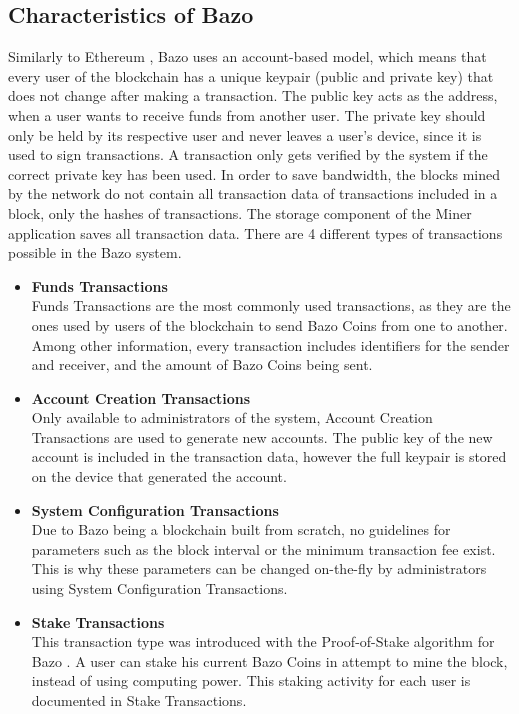 \subsection{Characteristics of Bazo}
Similarly to Ethereum \cite{ethereum}, Bazo uses an account-based model, which means that every user of the blockchain has a unique keypair (public and private key) that does not change after making a transaction. The public key acts as the address, when a user wants to receive funds from another user. The private key should only be held by its respective user and never leaves a user's device, since it is used to sign transactions. A transaction only gets verified by the system if the correct private key has been used. In order to save bandwidth, the blocks mined by the network do not contain all transaction data of transactions included in a block, only the hashes of transactions. The storage component of the Miner application saves all transaction data. There are 4 different types of transactions possible in the Bazo system.

\begin{itemize}
\item \textbf{Funds Transactions}\\
Funds Transactions are the most commonly used transactions, as they are the ones used by users of the blockchain to send Bazo Coins from one to another. Among other information, every transaction includes identifiers for the sender and receiver, and the amount of Bazo Coins being sent.
\item \textbf{Account Creation Transactions}\\
Only available to administrators of the system, Account Creation Transactions are used to generate new accounts. The public key of the new account is included in the transaction data, however the full keypair is stored on the device that generated the account.
\item \textbf{System Configuration Transactions}\\
Due to Bazo being a blockchain built from scratch, no guidelines for parameters such as the block interval or the minimum transaction fee exist. This is why these parameters can be changed on-the-fly by administrators using System Configuration Transactions.
\item \textbf{Stake Transactions}\\
This transaction type was introduced with the Proof-of-Stake algorithm for Bazo \cite{pos}. A user can stake his current Bazo Coins in attempt to mine the block, instead of using computing power. This staking activity for each user is documented in Stake Transactions.
\end{itemize}

